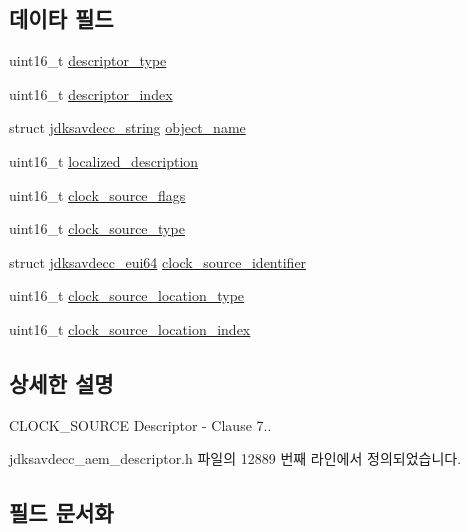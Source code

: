 \subsection*{데이타 필드}
\begin{DoxyCompactItemize}
\item 
uint16\+\_\+t \hyperlink{structjdksavdecc__descriptor__clock__source_ab7c32b6c7131c13d4ea3b7ee2f09b78d}{descriptor\+\_\+type}
\item 
uint16\+\_\+t \hyperlink{structjdksavdecc__descriptor__clock__source_a042bbc76d835b82d27c1932431ee38d4}{descriptor\+\_\+index}
\item 
struct \hyperlink{structjdksavdecc__string}{jdksavdecc\+\_\+string} \hyperlink{structjdksavdecc__descriptor__clock__source_a7d1f5945a13863b1762fc6db74fa8f80}{object\+\_\+name}
\item 
uint16\+\_\+t \hyperlink{structjdksavdecc__descriptor__clock__source_a0926f846ca65a83ad5bb06b4aff8f408}{localized\+\_\+description}
\item 
uint16\+\_\+t \hyperlink{structjdksavdecc__descriptor__clock__source_a564b48229d2ee13e7caca2ac09490a0b}{clock\+\_\+source\+\_\+flags}
\item 
uint16\+\_\+t \hyperlink{structjdksavdecc__descriptor__clock__source_ae3108efe2ae46da2955a6a8aeb45ea02}{clock\+\_\+source\+\_\+type}
\item 
struct \hyperlink{structjdksavdecc__eui64}{jdksavdecc\+\_\+eui64} \hyperlink{structjdksavdecc__descriptor__clock__source_ab80a8a949bc506f1690d2326167b3707}{clock\+\_\+source\+\_\+identifier}
\item 
uint16\+\_\+t \hyperlink{structjdksavdecc__descriptor__clock__source_aa1b89e381447b34cdb73d97f8e11405b}{clock\+\_\+source\+\_\+location\+\_\+type}
\item 
uint16\+\_\+t \hyperlink{structjdksavdecc__descriptor__clock__source_a598dddbb71e2f7dd57835ed93efdc02d}{clock\+\_\+source\+\_\+location\+\_\+index}
\end{DoxyCompactItemize}


\subsection{상세한 설명}
C\+L\+O\+C\+K\+\_\+\+S\+O\+U\+R\+CE Descriptor -\/ Clause 7.. 

jdksavdecc\+\_\+aem\+\_\+descriptor.\+h 파일의 12889 번째 라인에서 정의되었습니다.



\subsection{필드 문서화}
